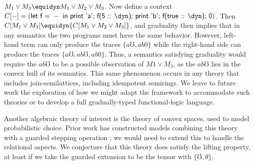 \documentclass[acmsmall,screen,review,anonymous]{acmart}
\theoremstyle{remark}
\begin{document}
$M_1 \vee M_3 \equidyn M_1 \vee M_2 \vee M_3$. Now define a context
%
$C[-] = (\textsf{let f = } - \textsf{ in print 'a'; f(5 :: \dyn); print 'b'; f(true :: \dyn); 0})$.
%
Then ${C[M_1 \vee M_3]} \equidyn {C[M_1 \vee M_2 \vee M_3]}$, and graduality
then implies that in any semantics the two programs must have the same behavior.
%
However, left-hand term can only produce the traces $\{ a\mho, ab0 \}$ while the right-hand side can produce the traces $\{ a\mho, ab\mho, ab0 \}$. Thus, a semantics satisfying graduality would require the $ab\mho$ to be a possible observation of $M1 \vee M_3$, as the $ab\mho$ lies in the convex hull of its semantics.
%
%
%
%
%
%
This same phenomenon occurs in any theory that includes join-semilattices,
including idempotent semirings. We leave to future work the exploration of how
we might adapt the framework to accommodate such theories or to develop a full
gradually-typed functional-logic language.


Another algebraic theory of interest is the theory of convex spaces, used to
model probabilistic choice. Prior work has constructed models combining this
theory with a guarded stepping operation
\cite{recursion-probabilistic-choice-guarded}; we would need to extend this to
handle the relational aspects. We conjecture that this theory does satisfy the
lifting property, at least if we take the guarded extension to be the tensor
with $\{\mho, \theta\}$.
\end{document}
